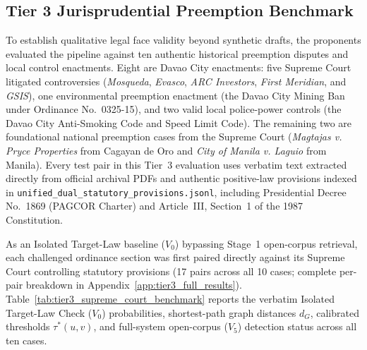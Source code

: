\subsection{Tier 3 Jurisprudential Preemption Benchmark}
\label{sec:tier3_supreme_court_benchmark}

To establish qualitative legal face validity beyond synthetic drafts, the proponents evaluated the pipeline against ten authentic historical preemption disputes and local control enactments. Eight are Davao City enactments: five Supreme Court litigated controversies (\textit{Mosqueda}, \textit{Evasco}, \textit{ARC Investors}, \textit{First Meridian}, and \textit{GSIS}), one environmental preemption enactment (the Davao City Mining Ban under Ordinance No.~0325-15), and two valid local police-power controls (the Davao City Anti-Smoking Code and Speed Limit Code). The remaining two are foundational national preemption cases from the Supreme Court (\textit{Magtajas v. Pryce Properties} from Cagayan de Oro and \textit{City of Manila v. Laguio} from Manila). Every test pair in this Tier~3 evaluation uses verbatim text extracted directly from official archival PDFs and authentic positive-law provisions indexed in \texttt{unified\_dual\_statutory\_provisions.jsonl}, including Presidential Decree No.~1869 (PAGCOR Charter) and Article~III, Section~1 of the 1987 Constitution.

As an Isolated Target-Law baseline ($V_0$) bypassing Stage~1 open-corpus retrieval, each challenged ordinance section was first paired directly against its Supreme Court controlling statutory provisions (17 pairs across all 10 cases; complete per-pair breakdown in Appendix~\ref{app:tier3_full_results}). Table~\ref{tab:tier3_supreme_court_benchmark} reports the verbatim Isolated Target-Law Check ($V_0$) probabilities, shortest-path graph distances $d_G$, calibrated thresholds $\tau^*(u, v)$, and full-system open-corpus ($V_5$) detection status across all ten cases.

